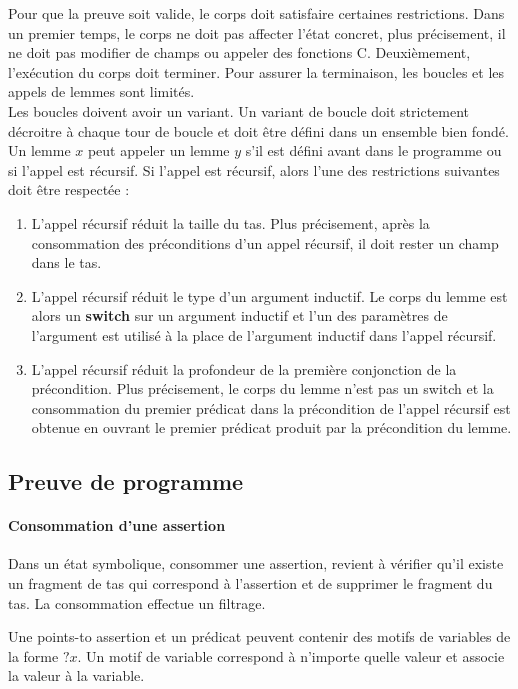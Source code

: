 \documentclass[11pt,openany]{article}
\begin{document}
			Pour que la preuve soit valide, le corps doit satisfaire certaines restrictions. Dans un premier temps, le corps ne doit pas affecter l'\'etat concret, plus pr\'ecisement, il ne doit pas modifier de champs ou appeler des fonctions C. Deuxi\`emement, l'ex\'ecution du corps doit terminer. Pour assurer la terminaison, les boucles et les appels de lemmes sont limit\'es. \\
			Les boucles doivent avoir un variant. Un variant de boucle doit strictement d\'ecroitre  \`a chaque tour de boucle et doit \^etre d\'efini dans un ensemble bien fond\'e.\\
			Un lemme $x$ peut appeler un lemme $y$ s'il est d\'efini avant dans le programme ou si l'appel est r\'ecursif. Si l'appel est r\'ecursif, alors l'une des restrictions suivantes doit \^etre respect\'ee :
			\begin{enumerate}
			\item L'appel r\'ecursif r\'eduit la taille du tas. Plus pr\'ecisement, apr\`es la consommation des pr\'econditions d'un appel r\'ecursif, il doit rester un champ dans le tas.
			\item L'appel r\'ecursif r\'eduit le type d'un argument inductif. Le corps du lemme est alors un \textbf{switch} sur un argument inductif et l'un des param\`etres de l'argument est utilis\'e \`a la place de l'argument inductif dans l'appel r\'ecursif.
			\item L'appel r\'ecursif r\'eduit la profondeur de la premi\`ere conjonction de la pr\'econdition. Plus pr\'ecisement, le corps du lemme n'est pas un switch et la consommation du premier pr\'edicat dans la pr\'econdition de l'appel r\'ecursif est obtenue en ouvrant le premier pr\'edicat produit par la pr\'econdition du lemme.
			\end{enumerate}
				

	\subsection{Preuve de programme}
	
	\paragraph{Consommation d'une assertion}
			Dans un \'etat symbolique, consommer une assertion, revient \`a v\'erifier qu'il existe un fragment de tas qui correspond \`a l'assertion et de supprimer le fragment du tas. La consommation effectue un filtrage.
	
	Une points-to assertion et un pr\'edicat peuvent contenir des motifs de variables de la forme $?x$. Un motif de variable correspond \`a n'importe quelle valeur et associe la valeur \`a la variable.
	
\end{document}
